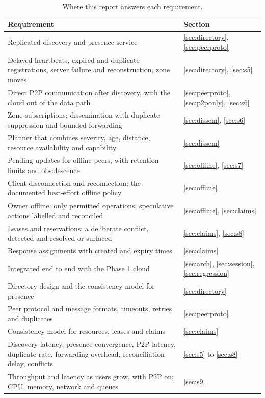 \begin{table}[!htb]
\centering\small
\caption{Where this report answers each requirement.}
\label{tab:reqmap}
\begin{tabularx}{\linewidth}{@{}Lp{2.6cm}@{}}
\toprule
Requirement & Section \\
\midrule
Replicated discovery and presence service & \ref{sec:directory}, \ref{sec:peerproto} \\
Delayed heartbeats, expired and duplicate registrations, server failure and reconstruction, zone moves & \ref{sec:directory}, \ref{sec:s5} \\
Direct P2P communication after discovery, with the cloud out of the data path & \ref{sec:peerproto}, \ref{sec:p2ponly}, \ref{sec:s6} \\
Zone subscriptions; dissemination with duplicate suppression and bounded forwarding & \ref{sec:dissem}, \ref{sec:s6} \\
Planner that combines severity, age, distance, resource availability and capability & \ref{sec:dissem} \\
Pending updates for offline peers, with retention limits and obsolescence & \ref{sec:offline}, \ref{sec:s7} \\
Client disconnection and reconnection; the documented best-effort offline policy & \ref{sec:offline} \\
Owner offline: only permitted operations; speculative actions labelled and reconciled & \ref{sec:offline}, \ref{sec:claims} \\
Leases and reservations; a deliberate conflict, detected and resolved or surfaced & \ref{sec:claims}, \ref{sec:s8} \\
Response assignments with created and expiry times & \ref{sec:claims} \\
Integrated end to end with the Phase 1 cloud & \ref{sec:arch}, \ref{sec:session}, \ref{sec:regression} \\
Directory design and the consistency model for presence & \ref{sec:directory} \\
Peer protocol and message formats, timeouts, retries and duplicates & \ref{sec:peerproto} \\
Consistency model for resources, leases and claims & \ref{sec:claims} \\
Discovery latency, presence convergence, P2P latency, duplicate rate, forwarding overhead, reconciliation delay, conflicts & \ref{sec:s5} to \ref{sec:s8} \\
Throughput and latency as users grow, with P2P on; CPU, memory, network and queues & \ref{sec:s9} \\

\end{tabularx}
\end{table}
